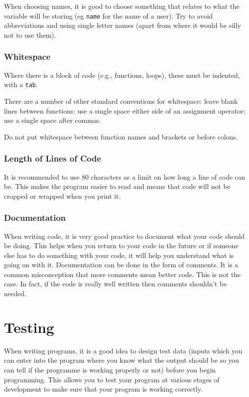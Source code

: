 When choosing names, it is good to choose something that relates to what the variable will be storing (eg \verb|name| for the name of a user). Try to avoid abbreviations and using single letter names (apart from where it would be silly not to use them).

\subsubsection*{Whitespace}
Where there is a block of code (e.g., functions, loops), these must be indented, with a \verb|tab|.

There are a number of other standard conventions for whitespace: leave blank lines between functions; use a single space either side of an assignment operator; use a single space after commas.

Do not put whitespace between function names and brackets or before colons.

\subsubsection*{Length of Lines of Code}
It is recommended to use 80 characters as a limit on how long a line of code can be. This makes the program easier to read and means that code will not be cropped or wrapped when you print it. 

\subsubsection*{Documentation}
When writing code, it is very good practice to document what your code should be doing. This helps when you return to your code in the future or if someone else has to do something with your code, it will help you understand what is going on with it. Documentation can be done in the form of comments.
It is a common misconception that more comments mean better code. This is not the case. In fact, if the code is really well written then comments shouldn't be needed.

\section*{Testing}
When writing programs, it is a good idea to design test data (inputs which you can enter into the program where you know what the output should be so you can tell if the programme is working properly or not) before you begin programming. This allows you to test your program at various stages of development to make sure that your program is working correctly. 